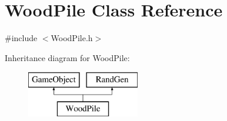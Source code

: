 \hypertarget{class_wood_pile}{}\section{Wood\+Pile Class Reference}
\label{class_wood_pile}


{\ttfamily \#include $<$Wood\+Pile.\+h$>$}

Inheritance diagram for Wood\+Pile\+:\begin{figure}[H]
\begin{center}
\leavevmode
\includegraphics[height=2.000000cm]{class_wood_pile}
\end{center}
\end{figure}
